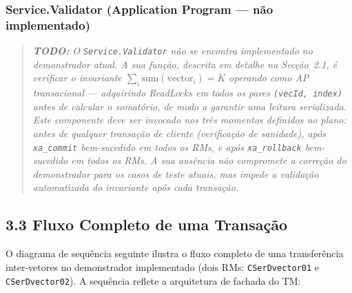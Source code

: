 \subsubsection*{Service.Validator (Application Program — não implementado)}

\begin{quote}
\textit{\textbf{TODO:} O \texttt{Service.Validator} não se encontra implementado no demonstrador
atual. A sua função, descrita em detalhe na Secção~2.1, é verificar o invariante
$\sum_i \text{sum}(\text{vector}_i) = K$ operando como AP transacional --- adquirindo
ReadLocks em todos os pares \texttt{(vecId,~index)} antes de calcular o somatório, de modo a
garantir uma leitura serializada. Este componente deve ser invocado nos três momentos definidos
no plano: antes de qualquer transação de cliente (verificação de sanidade), após
\texttt{xa\_commit} bem-sucedido em todos os RMs, e após \texttt{xa\_rollback} bem-sucedido em
todos os RMs. A sua ausência não compromete a correção do demonstrador para os casos de teste
atuais, mas impede a validação automatizada do invariante após cada transação.}
\end{quote}

\subsection*{3.3 Fluxo Completo de uma Transação}

O diagrama de sequência seguinte ilustra o fluxo completo de uma transferência
inter-vetores no demonstrador implementado (dois RMs: \texttt{CSerDvector01} e
\texttt{CSerDvector02}). A sequência reflete a arquitetura de fachada do TM:

